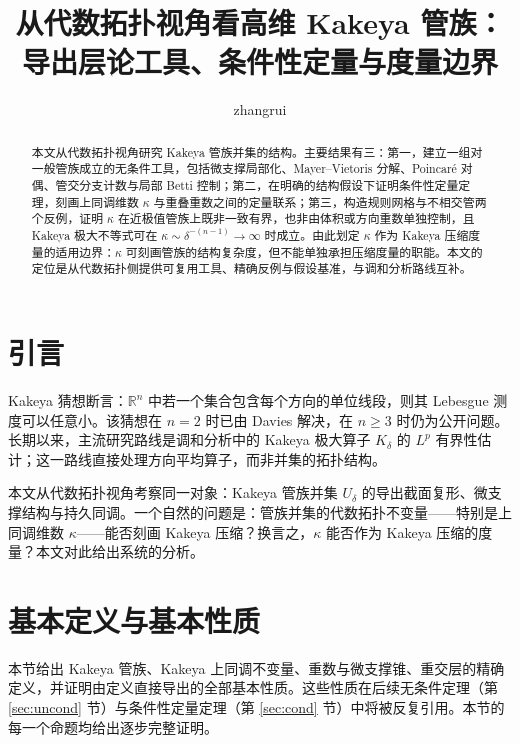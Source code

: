 \documentclass[11pt,a4paper]{article}
\title{从代数拓扑视角看高维 Kakeya 管族：导出层论工具、条件性定量与度量边界}
\author{zhangrui}
\date{}
\theoremstyle{remark}
\begin{document}
	\maketitle
	
	\begin{abstract}
		本文从代数拓扑视角研究 Kakeya 管族并集的结构。主要结果有三：第一，建立一组对一般管族成立的无条件工具，包括微支撑局部化、Mayer--Vietoris 分解、Poincaré 对偶、管交分支计数与局部 Betti 控制；第二，在明确的结构假设下证明条件性定量定理，刻画上同调维数 $\kappa$ 与重叠重数之间的定量联系；第三，构造规则网格与不相交管两个反例，证明 $\kappa$ 在近极值管族上既非一致有界，也非由体积或方向重数单独控制，且 Kakeya 极大不等式可在 $\kappa \sim \delta^{-(n-1)} \to \infty$ 时成立。由此划定 $\kappa$ 作为 Kakeya 压缩度量的适用边界：$\kappa$ 可刻画管族的结构复杂度，但不能单独承担压缩度量的职能。本文的定位是从代数拓扑侧提供可复用工具、精确反例与假设基准，与调和分析路线互补。
	\end{abstract}
	
	\section{引言}
	Kakeya 猜想断言：$\mathbb R^n$ 中若一个集合包含每个方向的单位线段，则其 Lebesgue 测度可以任意小。该猜想在 $n=2$ 时已由 Davies \cite{Davies1971} 解决，在 $n \ge 3$ 时仍为公开问题。长期以来，主流研究路线是调和分析中的 Kakeya 极大算子 $K_\delta$ 的 $L^p$ 有界性估计；这一路线直接处理方向平均算子，而非并集的拓扑结构。
	
	本文从代数拓扑视角考察同一对象：Kakeya 管族并集 $U_\delta$ 的导出截面复形、微支撑结构与持久同调。一个自然的问题是：管族并集的代数拓扑不变量——特别是上同调维数 $\kappa$——能否刻画 Kakeya 压缩？换言之，$\kappa$ 能否作为 Kakeya 压缩的度量？本文对此给出系统的分析。
	
	\section{基本定义与基本性质}
	本节给出 Kakeya 管族、Kakeya 上同调不变量、重数与微支撑锥、重交层的精确定义，并证明由定义直接导出的全部基本性质。这些性质在后续无条件定理（第 \ref{sec:uncond} 节）与条件性定量定理（第 \ref{sec:cond} 节）中将被反复引用。本节的每一个命题均给出逐步完整证明。
	
\end{document}
